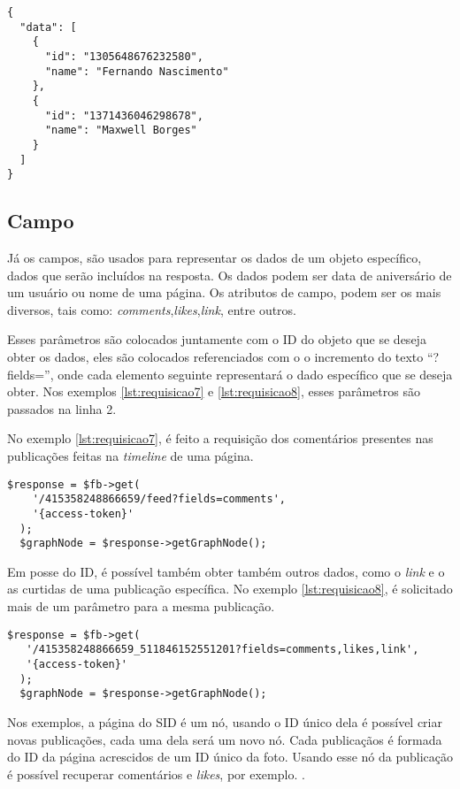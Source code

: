 \begin{lstlisting}[caption={Resposta da requisição \ref{lst:curtidasComentario} (Likes)},label={lst:respostaCurtidas}]
{
  "data": [
    {
      "id": "1305648676232580",
      "name": "Fernando Nascimento"
    },
    {
      "id": "1371436046298678",
      "name": "Maxwell Borges"
    }
  ]
}
\end{lstlisting} 

\subsection{Campo}
Já os campos, são usados para representar os dados de um objeto específico, dados que serão incluídos na resposta. Os dados podem ser data de aniversário de um usuário ou nome de uma página. Os atributos de campo, podem ser os mais diversos, tais como: \textit{comments},\textit{likes},\textit{link}, entre outros. 

Esses parâmetros são colocados juntamente com o ID do objeto que se deseja obter os dados, eles são colocados referenciados com o o incremento do texto ``?fields='', onde cada elemento seguinte representará o dado específico que se deseja obter. Nos exemplos \ref{lst:requisicao7} e \ref{lst:requisicao8}, esses parâmetros são passados na linha 2.

No exemplo \ref{lst:requisicao7}, é feito a requisição dos comentários presentes nas publicações feitas na \textit{timeline} de uma página.

\begin{lstlisting}[caption={Requisitar os comentários de todas as publicações da página},label={lst:requisicao7}]
  $response = $fb->get(
    '/415358248866659/feed?fields=comments',
    '{access-token}' 
  );
  $graphNode = $response->getGraphNode(); 
\end{lstlisting}

Em posse do ID, é possível também obter também outros dados, como o \textit{link} e o as curtidas de uma publicação específica. No exemplo \ref{lst:requisicao8}, é solicitado mais de um parâmetro para a mesma publicação.

\begin{lstlisting}[caption={Requsição de diversos atributos},label={lst:requisicao8}]
  $response = $fb->get(
   '/415358248866659_511846152551201?fields=comments,likes,link', 
   '{access-token}'
  );
  $graphNode = $response->getGraphNode();
\end{lstlisting}

Nos exemplos, a página do SID é um nó, usando o ID único dela é possível criar novas publicações, cada uma dela será um novo nó. Cada publicaçãos é formada do ID da página acrescidos de um ID único da foto. Usando esse nó da publicação é possível recuperar comentários e \textit{likes}, por exemplo. \cite{facebook2018b}.

